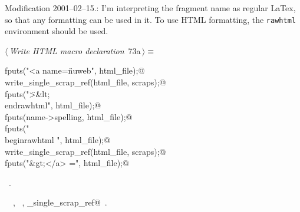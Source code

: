 \documentclass[a4paper]{report}
\begin{document}
Modification 2001--02--15.: I'm interpreting the fragment name
as regular LaTex, so that any formatting can be used in it. To use
HTML formatting, the \verb|rawhtml| environment should be used.

\begin{flushleft} \small
\begin{minipage}{\linewidth}\label{scrap143}\raggedright\small
{} $\langle\,${\it Write HTML macro declaration}\nobreak\ {\footnotesize {73a}}$\,\rangle\equiv$
\vspace{-1ex}
\begin{list}{}{} \item
\mbox{}\verb@  fputs("<a name=\"nuweb", html_file);@\\
\mbox{}\verb@  write_single_scrap_ref(html_file, scraps);@\\
\mbox{}\verb@  fputs("\">&lt;\\end{rawhtml}", html_file);@\\
\mbox{}\verb@  fputs(name->spelling, html_file);@\\
\mbox{}\verb@  fputs("\\begin{rawhtml} ", html_file);@\\
\mbox{}\verb@  write_single_scrap_ref(html_file, scraps);@\\
\mbox{}\verb@  fputs("&gt;</a> =\n", html_file);@\\
\mbox{}\verb@@{\NWsep}
\end{list}
\vspace{-1.5ex}
\footnotesize
\begin{list}{}{\setlength{\itemsep}{-\parsep}\setlength{\itemindent}{-\leftmargin}}
\item \NWtxtMacroRefIn\ .
\item \NWtxtIdentsUsed\nobreak\  \verb@fputs@\nobreak\ , \verb@scraps@\nobreak\ , \verb@write_single_scrap_ref@\nobreak\ .
\item{}
\end{list}
\end{minipage}\vspace{4ex}
\end{flushleft}
\end{document}
